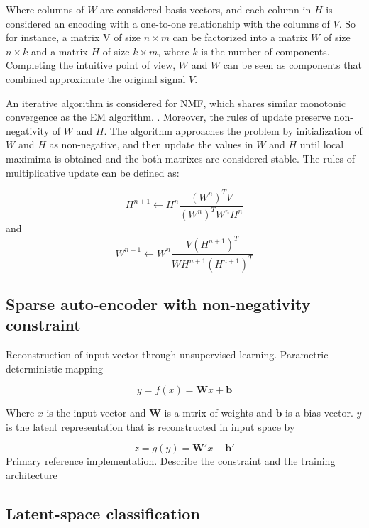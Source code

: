\documentclass{article}
\begin{document}
Where columns of $W$ are considered basis vectors, and each column in $H$ is considered an encoding with a one-to-one relationship with the columns of $V$. So for instance, a matrix V of size $n \times m$ can be factorized into a matrix $W$ of size $n \times k$ and a matrix $H$ of size $k \times m$, where $k$ is the number of components. Completing the intuitive point of view, $W$ and $W$ can be seen as components that combined approximate the original signal $V$.

An iterative algorithm is considered for NMF, which shares similar monotonic convergence as the EM algorithm. \cite{Dempster1977}. Moreover, the rules of update preserve non-negativity of $W$ and $H$. The algorithm approaches the problem by initialization of $W$ and $H$ as non-negative, and then update the values in $W$ and $H$ until local maximima is obtained and the both matrixes are considered stable. The rules of multiplicative update can be defined as:

\begin{equation}
H^{n+1} \leftarrow H^{n} \frac{(W^n)^TV}{(W^n)^TW^nH^n}
\end{equation}
and 
\begin{equation}
W^{n+1} \leftarrow W^{n} \frac{V(H^{n+1})^T}{WH^{n+1}(H^{n+1})^T}
\end{equation}


\subsection{Sparse auto-encoder with non-negativity constraint}

Reconstruction of input vector through unsupervised learning. Parametric deterministic mapping \cite{Vincent}

\begin{equation}
y = f(x) = \mathbf{W}x + \mathbf{b}
\end{equation}

Where $x$ is the input vector and $\mathbf{W}$ is a mtrix of weights and $\mathbf{b}$ is a bias vector. $y$ is the latent representation that is reconstructed in input space by 

\begin{equation}
z = g(y) = \mathbf{W'}x + \mathbf{b'}
\end{equation}
Primary reference implementation. Describe the constraint and the training architecture

\subsection{Latent-space classification}
\end{document}
